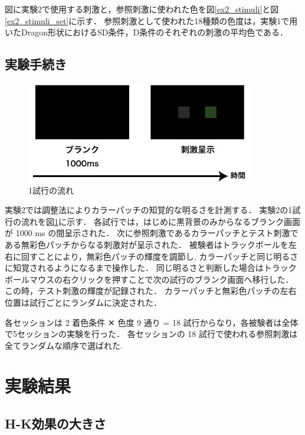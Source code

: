             図に実験2で使用する刺激と，参照刺激に使われた色を図\ref{ex2_stimuli}と図\ref{ex2_stimuli_set}に示す．
            参照刺激として使われた18種類の色度は，実験1で用いたDragon形状におけるSD条件，D条件のそれぞれの刺激の平均色である．

        \subsection{実験手続き}

            \begin{figure}[h]
                \centering
                \includegraphics[width=10.0cm]{./img/ex2_procedure.png}
                \caption{1試行の流れ}
                \label{ex2_procedure}
            \end{figure}

            実験2では調整法によりカラーパッチの知覚的な明るさを計測する．
            実験2の1試行の流れを図\ref{ex2_procedure}に示す．
            各試行では，はじめに黒背景のみからなるブランク画面が 1000 ms の間呈示された．
            次に参照刺激であるカラーパッチとテスト刺激である無彩色パッチからなる刺激対が呈示された．
            被験者はトラックボールを左右に回すことにより，無彩色パッチの輝度を調節し, カラーパッチと同じ明るさに知覚されるようになるまで操作した．
            同じ明るさと判断した場合はトラックボールマウスの右クリックを押すことで次の試行のブランク画面へ移行した．
            この時，テスト刺激の輝度が記録された．
            カラーパッチと無彩色パッチの左右位置は試行ごとにランダムに決定された．

            各セッションは 2 着色条件 ✕ 色度 9 通り = 18 試行からなり，各被験者は全体で5セッションの実験を行った．
            各セッションの 18 試行で使われる参照刺激は全てランダムな順序で選ばれた.

    \section{実験結果}

        \subsection{H-K効果の大きさ}

